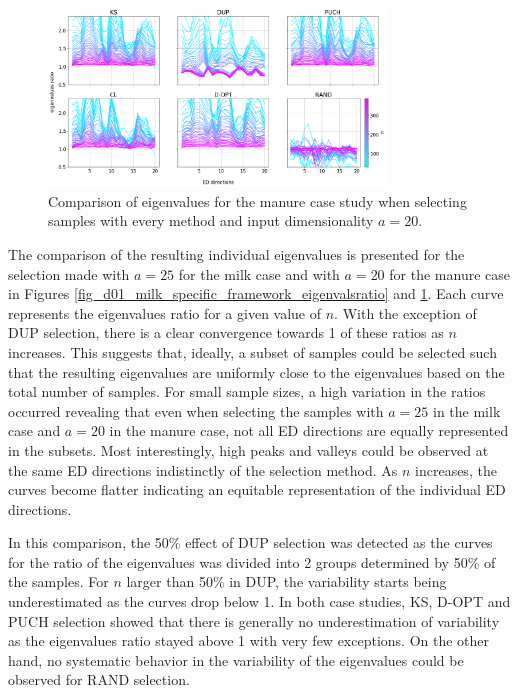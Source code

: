 \documentclass[preprint,12pt]{elsarticle}
\begin{document}
\begin{figure}[H]
\includegraphics[width=0.8\textwidth]{manuscript/figures/d02_manure_specific_framework_eigenvalsratio.png}
\centering
\caption{Comparison of eigenvalues for the manure case study when selecting samples with every method and input dimensionality $a=20$.}
\label{fig_d02_manure_specific_framework_eigenvalsratio}
\end{figure}

The comparison of the resulting individual eigenvalues is presented for the selection made with $a = 25$ for the milk case and with $a=20$ for the manure case in Figures \ref{fig_d01_milk_specific_framework_eigenvalsratio} and \ref{fig_d02_manure_specific_framework_eigenvalsratio}. Each curve represents the eigenvalues ratio for a given value of $n$. With the exception of DUP selection, there is a clear convergence towards 1 of these ratios as $n$ increases. This suggests that, ideally, a subset of samples could be selected such that the resulting eigenvalues are uniformly close to the eigenvalues based on the total number of samples. For small sample sizes, a high variation in the ratios occurred revealing that even when selecting the samples with $a=25$ in the milk case and $a=20$ in the manure case, not all ED directions are equally represented in the subsets. Most interestingly, high peaks and valleys could be observed at the same ED directions indistinctly of the selection method. As $n$ increases, the curves become flatter indicating an equitable representation of the individual ED directions. 

In this comparison, the 50\% effect of DUP selection was detected as the curves for the ratio of the eigenvalues was divided into 2 groups determined by 50\% of the samples. For $n$ larger than 50\% in DUP, the variability starts being underestimated as the curves drop below 1. In both case studies, KS, D-OPT and PUCH selection showed that there is generally no underestimation of variability as the eigenvalues ratio stayed above 1 with very few exceptions. On the other hand, no systematic behavior in the variability of the eigenvalues could be observed for RAND selection. 
\end{document}
